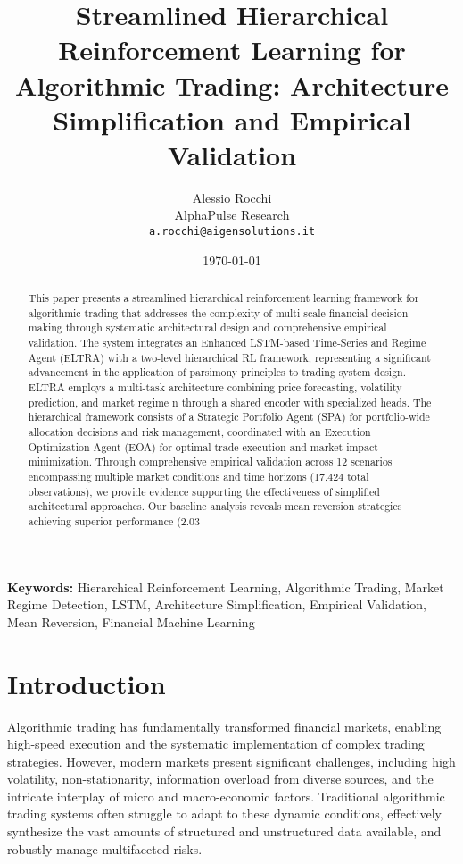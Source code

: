 \documentclass[11pt]{article}
\title{Streamlined Hierarchical Reinforcement Learning for Algorithmic Trading: Architecture Simplification and Empirical Validation}
\author{Alessio Rocchi\\
AlphaPulse Research\\
\texttt{a.rocchi@aigensolutions.it}}
\date{\today}
\begin{document}
\maketitle

\begin{abstract}
This paper presents a streamlined hierarchical reinforcement learning framework for algorithmic trading that addresses the complexity of multi-scale financial decision making through systematic architectural design and comprehensive empirical validation. The system integrates an Enhanced LSTM-based Time-Series and Regime Agent (ELTRA) with a two-level hierarchical RL framework, representing a significant advancement in the application of parsimony principles to trading system design. ELTRA employs a multi-task architecture combining price forecasting, volatility prediction, and market regime n through a shared encoder with specialized heads. The hierarchical framework consists of a Strategic Portfolio Agent (SPA) for portfolio-wide allocation decisions and risk management, coordinated with an Execution Optimization Agent (EOA) for optimal trade execution and market impact minimization. Through comprehensive empirical validation across 12 scenarios encompassing multiple market conditions and time horizons (17,424 total observations), we provide evidence supporting the effectiveness of simplified architectural approaches. Our baseline analysis reveals mean reversion strategies achieving superior performance (2.03%
\end{abstract}

\textbf{Keywords:} Hierarchical Reinforcement Learning, Algorithmic Trading, Market Regime Detection, LSTM, Architecture Simplification, Empirical Validation, Mean Reversion, Financial Machine Learning

\section{Introduction}

Algorithmic trading has fundamentally transformed financial markets, enabling high-speed execution and the systematic implementation of complex trading strategies. However, modern markets present significant challenges, including high volatility, non-stationarity, information overload from diverse sources, and the intricate interplay of micro and macro-economic factors. Traditional algorithmic trading systems often struggle to adapt to these dynamic conditions, effectively synthesize the vast amounts of structured and unstructured data available, and robustly manage multifaceted risks.
\end{document}
